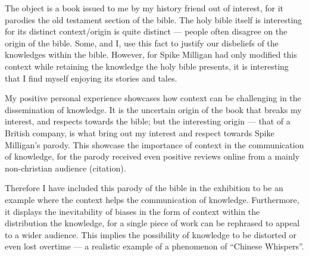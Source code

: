 \documentclass[a4paper,11pt]{article}
\begin{document}
The object is a book issued to me by my history friend out of interest, for it parodies the old testament section of the bible. The holy bible itself is interesting for its distinct context/origin is quite distinct --- people often disagree on the origin of the bible. Some, and I, use this fact to justify our disbeliefs of the knowledges within the bible. However, for Spike Milligan had only modified this context while retaining the knowledge the holy bible presents, it is interesting that I find myself enjoying its stories and tales.

My positive personal experience showcases how context can be challenging in the dissemination of knowledge. It is the uncertain origin of the book that breaks my interest, and respects towards the bible; but the interesting origin --- that of a British company, is what bring out my interest and respect towards Spike Milligan's parody. This showcase the importance of context in the communication of knowledge, for the parody received even positive reviews online from a mainly non-christian audience (citation).




Therefore I have included this parody of the bible in the exhibition to be an example where the context helps the communication of knowledge. Furthermore, it displays the inevitability of biases in the form of context within the distribution the knowledge, for a single piece of work can be rephrased to appeal to a wider audience. This implies the possibility of knowledge to be distorted or even lost overtime --- a realistic example of a phenomenon of ``Chinese Whispers''.
\end{document}
